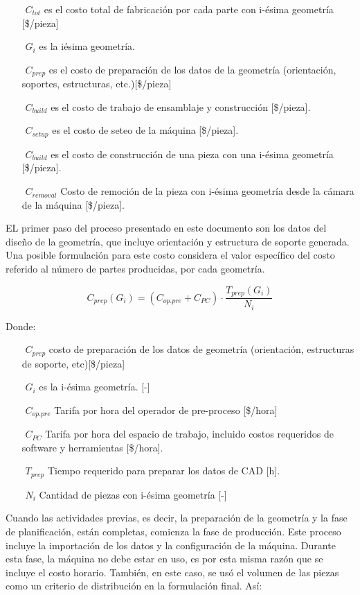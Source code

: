 \begin{description}
\begin{itemize}
\item[$ $] $C_{tot} $ es el costo total de fabricación por cada parte con i-ésima geometría [\$/pieza]
\item[$ $] $G_i $ es la iésima geometría.
\item[$ $] $C_{prep} $ es el costo de preparación de los datos de la geometría (orientación, soportes, estructuras, etc.)[\$/pieza]
\item[$ $] $C_{build} $ es el costo de trabajo de ensamblaje y construcción [\$/pieza].
\item[$ $] $C_{setup} $ es el costo de seteo de la máquina [\$/pieza].
\item[$ $] $C_{build} $ es el costo de construcción de una pieza con una i-ésima geometría [\$/pieza].
\item[$ $] $C_{removal} $ Costo de remoción de la pieza con i-ésima geometría desde la cámara de la máquina [\$/pieza].
\end{itemize}

EL primer paso del proceso presentado en este documento son los datos del diseño de la geometría, que incluye orientación y estructura de soporte generada. Una posible formulación para este costo considera el valor específico del costo referido al número de partes producidas, por cada geometría.  

$$C_{prep}(G_i)=(C_{op.pre}+C_{PC})\cdot \frac{T_{prep}(G_i)}{N_i}$$

Donde:

\begin{itemize}
\item[$ $] $C_{prep} $ costo de preparación de los datos de geometría (orientación, estructuras de soporte, etc)[\$/pieza] 
\item[$ $] $G_i $ es la i-ésima geometría. [-]
\item[$ $] $C_{op.pre} $ Tarifa por hora del operador de pre-proceso  [\$/hora]
\item[$ $] $C_{PC} $ Tarifa por hora del espacio de trabajo, incluido costos requeridos de software y herramientas [\$/hora].
\item[$ $] $T_{prep} $ Tiempo requerido para preparar los datos de CAD [h].
\item[$ $] $N_i$ Cantidad de piezas con i-ésima geometría [-]
\end{itemize}

Cuando las actividades previas, es decir, la preparación de la geometría y la fase de planificación, están completas, comienza la fase de producción. Este proceso incluye la importación de los datos y la configuración de la máquina. Durante esta fase, la máquina no debe estar en uso, es por esta misma razón que se incluye el costo horario. También, en este caso, se usó el volumen de las piezas como un criterio de distribución en la formulación final. Así:



\end{description}
